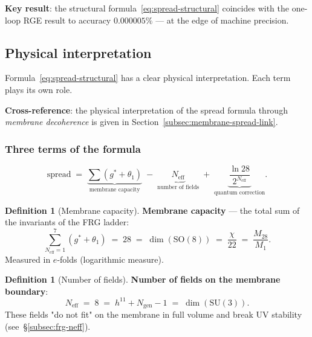 \documentclass[11pt,a4paper]{article}
\newcommand{\SU}{\ensuremath{\mathrm{SU}}}
\newcommand{\SO}{\ensuremath{\mathrm{SO}}}
\theoremstyle{definition}
\newtheorem{definition}[theorem]{Definition}
\begin{document}
\medskip\noindent
\textbf{Key result}: the structural formula~\eqref{eq:spread-structural}
coincides with the one-loop RGE result to accuracy
$\mathbf{0.000005\%}$ --- at the edge of machine precision.

\subsection{Physical interpretation}
\label{subsec:spread-meaning}

Formula~\eqref{eq:spread-structural} has a clear physical
interpretation. Each term plays its own role.

\medskip\noindent
\textbf{Cross-reference}: the physical interpretation
of the spread formula through \emph{membrane decoherence}
is given in Section~\ref{subsec:membrane-spread-link}.

\subsubsection{Three terms of the formula}

\begin{equation}
    \text{spread} \;=\;
    \underbrace{\sum (g^* + \theta_1)}_{\text{membrane capacity}}
    \;-\; \underbrace{N_{\text{eff}}}_{\text{number of fields}}
    \;+\; \underbrace{\frac{\ln 28}{2^{N_{\text{eff}}}}}_{\text{quantum correction}}.
    \label{eq:spread-three-terms}
\end{equation}

\begin{definition}[Membrane capacity]
\label{def:capacity}
\textbf{Membrane capacity} --- the total sum of the invariants of the FRG ladder:
\begin{equation}
    \boxed{
    \sum_{N_{\text{eff}}=1}^{7} (g^* + \theta_1) \;=\; 28
    \;=\; \dim(\SO(8)) \;=\; \frac{\chi}{22} \;=\; \frac{M_{28}}{M_1}.
    }
    \label{eq:capacity-value}
\end{equation}
Measured in $e$-folds (logarithmic measure).
\end{definition}

\begin{definition}[Number of fields]
\label{def:n-fields}
\textbf{Number of fields on the membrane boundary}:
\begin{equation}
    \boxed{
    N_{\text{eff}} \;=\; 8
    \;=\; h^{11} + N_{\text{gen}} - 1
    \;=\; \dim(\SU(3)).
    }
    \label{eq:n-fields-value}
\end{equation}
These fields "do not fit" on the membrane in full volume and
break UV stability (see~\S\ref{subsec:frg-neff}).
\end{definition}
\end{document}
